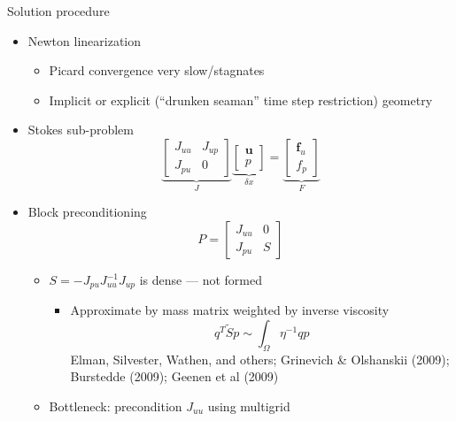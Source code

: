 \documentclass{beamer}
\begin{document}
\begin{frame}{Solution procedure}
  \begin{itemize}
  \item Newton linearization
    \begin{itemize}
    \item Picard convergence very slow/stagnates
    \item Implicit or explicit (``drunken seaman'' time step restriction) geometry
    \end{itemize}
  \item Stokes sub-problem
    \begin{equation*}
      \underbrace{\begin{bmatrix} J_{uu} & J_{up} \\ J_{pu} & 0 \end{bmatrix}}_{J} \underbrace{\begin{bmatrix} \bm u \\ p \end{bmatrix}}_{\delta x} = \underbrace{\begin{bmatrix} \bm f_u \\ f_p \end{bmatrix}}_F
    \end{equation*}
  \item Block preconditioning
    \begin{equation*}
      P = \begin{bmatrix} J_{uu} & 0 \\ J_{pu} & S \end{bmatrix}
    \end{equation*}
    \begin{itemize}
    \item $S = -J_{pu} J_{uu}^{-1} J_{up}$ is dense --- not formed
      \begin{itemize}
      \item Approximate by mass matrix weighted by inverse viscosity
        \begin{equation*}
          q^T \tilde S p \sim \int_\Omega \eta^{-1} q p
        \end{equation*}
        Elman, Silvester, Wathen, and others; Grinevich \& Olshanskii (2009); Burstedde (2009); Geenen et al (2009)
      \end{itemize}
    \item \alert{Bottleneck: precondition $J_{uu}$ using multigrid}
    \end{itemize}
  \end{itemize}
\end{frame}
\end{document}
